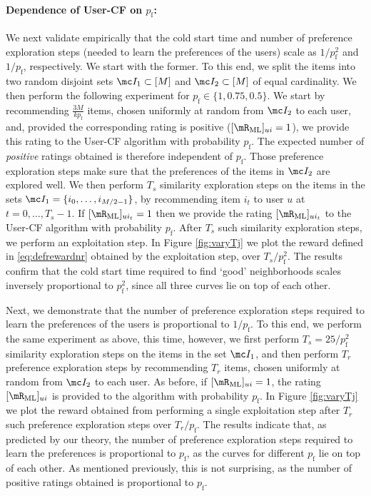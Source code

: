 \documentclass{article}
\newcommand\Comment[1]{\framebox[0.5\textwidth]{ \parbox{0.5\textwidth}{#1}  } \par}
\newcommand\pf{p_{\mathrm{f}}}
\newcommand\ocrating{R}
\begin{document}

\paragraph{Dependence of User-CF on $\pf$:}
We next validate empirically that the cold start time and number of  preference exploration steps (needed to learn the preferences of the users) scale as $1/\pf^2$ and $1/\pf$, respectively. 
We start with the former. 
To this end, we split the items into two random disjoint sets $\mc I_1\subset [M]$ and $\mc I_2 \subset [M]$ of equal cardinality. 
We then perform the following experiment for $\pf \in \{ 1,0.75,0.5\}$. 
We start by recommending $\frac{3 M}{k \pf}$ items, chosen uniformly at random from $\mc I_2$ to each user, and, provided the corresponding rating is positive ($[\RML]_{ui} = 1$), we provide this rating to the User-CF algorithm with probability $\pf$. 
The expected number of \emph{positive} ratings %
obtained is therefore independent of $\pf$. 
Those preference exploration steps make sure that the preferences of the items in $\mc I_2$ are explored well. 
We then perform $T_s$ similarity exploration steps on the items in the sets $\mc I_1 = \{i_0,\ldots,i_{M/2-1}\}$, by recommending item $i_{t}$ to user $u$ at $t=0,\ldots,T_s-1$. 
If $[\RML]_{u i_t} = 1$ then we provide the rating $[\RML]_{u i_t}$ to the User-CF algorithm with probability $\pf$. 
After $T_s$ such similarity exploration steps, we perform an exploitation step. 
In Figure \ref{fig:varyTj} we plot the reward defined in \eqref{eq:defrewardnr} obtained by the exploitation step, over $T_s/\pf^2$. 
The results confirm that the cold start time required to find `good' neighborhoods scales inversely proportional to $\pf^2$, since all three curves lie on top of each other. 



Next, we demonstrate that the number of preference exploration steps required to learn the preferences of the users is proportional to $1/\pf$. 
To this end, we perform the same experiment as above, this time, however, we first perform $T_s = 25/\pf^2$ similarity exploration steps on the items in the set $\mc I_1$, and then perform $T_r$ preference exploration steps by recommending $T_r$ items, chosen uniformly at random from $\mc I_2$ to each user. As before, if $[\RML]_{ui} = 1$, the rating $[\RML]_{ui}$ is provided to the algorithm with probability $\pf$. 
In Figure \ref{fig:varyTj} we plot the reward obtained from performing a single exploitation step after $T_r$ such preference exploration steps over $T_r/\pf$. 
The results indicate that, as predicted by our theory, the number of preference exploration steps required to learn the preferences is proportional to $\pf$, as the curves for different $\pf$ lie on top of each other.  
As mentioned previously, this is not surprising, as the number of positive ratings obtained is proportional to $\pf$. 
\end{document}
